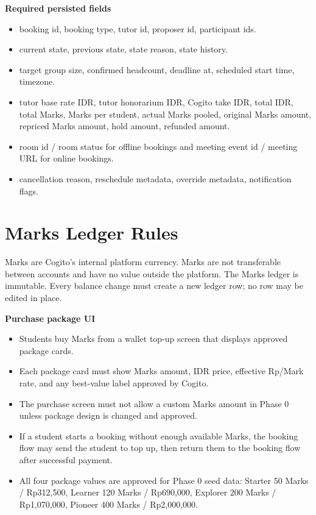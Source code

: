 \documentclass[11pt,a4paper]{article}
\begin{document}
\textbf{Required persisted fields}
\begin{itemize}
	\item booking id, booking type, tutor id, proposer id, participant ids.
	\item current state, previous state, state reason, state history.
	\item target group size, confirmed headcount, deadline at, scheduled start time, timezone.
	\item tutor base rate IDR, tutor honorarium IDR, Cogito take IDR, total IDR, total Marks, Marks per student, actual Marks pooled, original Marks amount, repriced Marks amount, hold amount, refunded amount.
	\item room id / room status for offline bookings and meeting event id / meeting URL for online bookings.
	\item cancellation reason, reschedule metadata, override metadata, notification flags.
\end{itemize}

\section{Marks Ledger Rules}

Marks are Cogito's internal platform currency. Marks are not transferable between accounts and have no value outside the platform. The Marks ledger is immutable. Every balance change must create a new ledger row; no row may be edited in place.

\textbf{Purchase package UI}
\begin{itemize}
    \item Students buy Marks from a wallet top-up screen that displays approved package cards.
    \item Each package card must show Marks amount, IDR price, effective Rp/Mark rate, and any best-value label approved by Cogito.
    \item The purchase screen must not allow a custom Marks amount in Phase 0 unless package design is changed and approved.
    \item If a student starts a booking without enough available Marks, the booking flow may send the student to top up, then return them to the booking flow after successful payment.
    \item All four package values are approved for Phase 0 seed data: Starter 50 Marks / Rp312,500, Learner 120 Marks / Rp690,000, Explorer 200 Marks / Rp1,070,000, Pioneer 400 Marks / Rp2,000,000.
\end{itemize}
\end{document}
